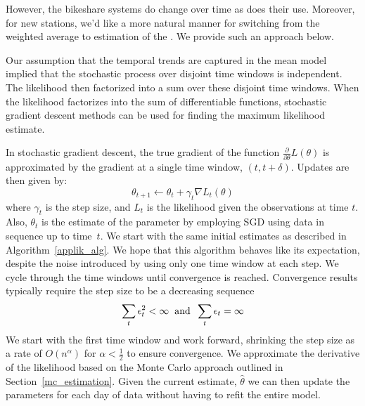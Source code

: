\documentclass{acm_proc_article-sp}
\begin{document}
However, the bikeshare systems do change over time as does their use.  Moreover, for new stations, we'd like a more natural manner for switching from the weighted average to estimation of the .  We provide such an approach below.

Our assumption that the temporal trends are captured in the mean model implied that the stochastic process over disjoint time windows is independent.  The likelihood then factorized into a sum over these disjoint time windows.  When the likelihood factorizes into the sum of differentiable functions, stochastic gradient descent methods can be used for finding the maximum likelihood estimate.

In stochastic gradient descent, the true gradient of the function $\frac{\partial}{\partial \theta} L( \theta)$ is approximated by the gradient at a single time window, $(t, t+\delta)$.  Updates are then given by:
\begin{equation}
\theta_{t+1} \gets \theta_{t} + \gamma_t \nabla L_t (\theta) 
\end{equation}
\noindent where $\gamma_t$ is the step size, and $L_t$ is the likelihood given the observations at time $t$.  Also, $\theta_t$ is the estimate of the parameter by employing SGD using data in sequence up to time~$t$.  We start with the same initial estimates as described in Algorithm~\ref{applik_alg}.  We hope that this algorithm behaves like its expectation, despite the noise introduced by using only one time window at each step.  We cycle through the time windows until convergence is reached. Convergence results typically require the step size to be a decreasing sequence 
\begin{equation} \label{sgd_conditions}
\sum_{t} \epsilon_t^2 < \infty \hspace{0.2 cm} \text{and} \hspace{0.2cm} \sum_{t} \epsilon_t = \infty
\end{equation}
\noindent We start with the first time window and work forward, shrinking the step size as a rate of $O(n^{\alpha})$ for $\alpha < \frac{1}{2}$ to ensure convergence.  We approximate the derivative of the likelihood based on the Monte Carlo approach outlined in Section~\ref{mc_estimation}.  Given the current estimate, $\hat{\theta}$ we can then update the parameters for each day of data without having to refit the entire model.
\end{document}
